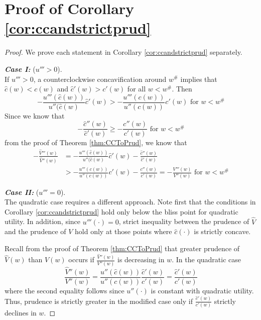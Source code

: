 \documentclass[titlepage]{\econtex}
\begin{document}
\section{Proof of Corollary \ref{cor:ccandstrictprud}} \label{app:ccandstrictprud}
\begin{proof}
	We prove each statement in Corollary \ref{cor:ccandstrictprud} separately. 
	
	\bigskip
	\noindent \textbf{\textit{Case I:}} ($ u ''' > 0$). \\
	If $u''' > 0$, a counterclockwise concavification around $w^{\#}$ implies that $\hat{c}(w) < c(w)$ and $\hat{c}'(w) > c'(w)$ for all $w < w^{\#}$. Then \[-\frac{u'''(\hat{c}(w))}{u''(\hat{c}(w)}\hat{c}'(w) > -\frac{u'''({c}(w))}{u''({c}(w))}{c}'(w) \text{ for } w < w^{\#} \]
	Since we know that \[-\frac{\hat{c}''(w)}{\hat{c}'(w)} \geq -\frac{{c}''(w)}{{c}'(w)} \text{ for } w < w^{\#}\]
	from the proof of Theorem \ref{thm:CCToPrud}, we know that
	\begin{align*}- \frac{\hat{V}'''(w)}{\hat{V}''(w)} &= -\frac{u'''(\hat{c}(w))}{u''(\hat{c}(w)}\hat{c}'(w) - \frac{\hat{c}''(w)}{\hat{c}'(w)}
	\\
	& > -\frac{u'''({c}(w))}{u''({c}(w))}{c}'(w) - \frac{{c}''(w)}{{c}'(w)} = - \frac{{V}'''(w)}{{V}''(w)} \text{ for } w < w^{\#}
	\end{align*}
	
	\bigskip
	\noindent \textbf{\textit{Case II:}} ($u''' = 0$). \\
	The quadratic case requires a different approach. Note first that the conditions in Corollary \ref{cor:ccandstrictprud} hold only below the bliss point for quadratic utility. In addition, since $u'''(\cdot) = 0$, strict inequality between the prudence of $\hat{V}$ and the prudence of $V$ hold only at those points where $\hat{c}(\cdot)$ is strictly concave. 
	
	Recall from the proof of Theorem \ref{thm:CCToPrud} that greater prudence of $\hat{V}(w)$ than $V(w)$ occurs if  $\frac{\hat{V}''(w)}{V''(w)}$ is decreasing in $w$. In the quadratic case
	\begin{equation}
	\frac{\hat{V}''(w)}{V''(w)} = \frac{u''(\hat{c}(w))}{u''(c(w))} \frac{\hat{c}'(w)}{c'(w)} = \frac{\hat{c}'(w)}{c'(w)}
	\end{equation}
	where the second equality follows since $u''(\cdot)$ is constant with quadratic utility. Thus, prudence is strictly greater in the modified case only if $ \frac{\hat{c}'(w)}{c'(w)}$ strictly declines in $w$.
\end{proof}
\end{document}
